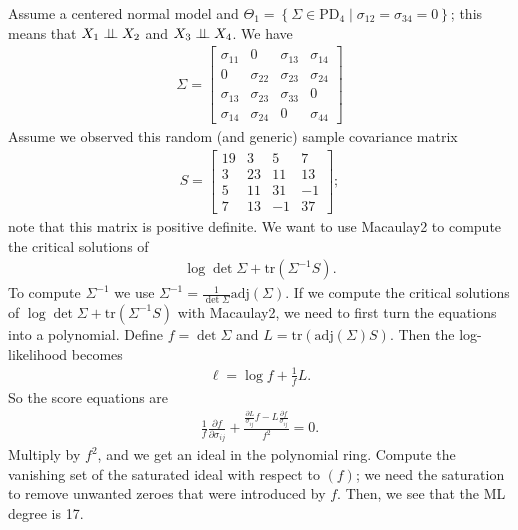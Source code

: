 \begin{eg}
  Assume a centered normal model and \( \Theta_1 = \left\{ \Sigma \in \mathrm{PD}_4 \mid \sigma_{12} = \sigma_{34} = 0 \right\} \); this means that \( X_1 \perp \!\!\! \perp X_2 \) and \( X_3 \perp \!\!\! \perp X_4 \). We have
  \begin{align*}
    \Sigma = \begin{bmatrix}
      \sigma_{11} & 0 & \sigma_{13} & \sigma_{14} \\
      0 & \sigma_{22} & \sigma_{23} & \sigma_{24} \\
      \sigma_{13} & \sigma_{23} & \sigma_{33} & 0 \\
      \sigma_{14} & \sigma_{24} & 0 & \sigma_{44}
    \end{bmatrix}
  \end{align*}
  Assume we observed this random (and generic) sample covariance matrix 
  \begin{align*}
    S = \begin{bmatrix}
      19 & 3 & 5 & 7 \\
      3 & 23 & 11 & 13 \\
      5 & 11 & 31 & -1 \\
      7 & 13 & -1 & 37
    \end{bmatrix};
  \end{align*}
  note that this matrix is positive definite. We want to use Macaulay2 to compute the critical solutions of 
  \begin{align*}
    \log \det \Sigma + \mathrm{tr}(\Sigma^{-1}S).
  \end{align*}
  To compute \( \Sigma^{-1} \) we use \(     \Sigma^{-1} = \frac{1}{\det \Sigma}\mathrm{adj}(\Sigma)
  \).
  If we compute the critical solutions of \(  \log \det \Sigma + \mathrm{tr}(\Sigma^{-1}S) \) with Macaulay2, we need to first turn the equations into a polynomial. Define \( f = \det \Sigma \) and \( L = \mathrm{tr}(\mathrm{adj}(\Sigma) S) \). Then the log-likelihood becomes
  \begin{align*}
    \ell = \log f + \frac{1}{f}L.
  \end{align*}
  So the score equations are
  \begin{align*}
   \frac{1}{f}\frac{\partial f}{\partial \sigma_{ij}} + \frac{\frac{\partial L}{\sigma_{ij}}f - L \frac{\partial f}{\sigma_{ij}}}{f^2} = 0.
  \end{align*}
  Multiply by \( f^2 \), and we get an ideal in the polynomial ring. Compute the vanishing set of the saturated ideal with respect to \( (f) \); we need the saturation to remove unwanted zeroes that were introduced by \( f \). Then, we see that the ML degree is 17.
\end{eg}


